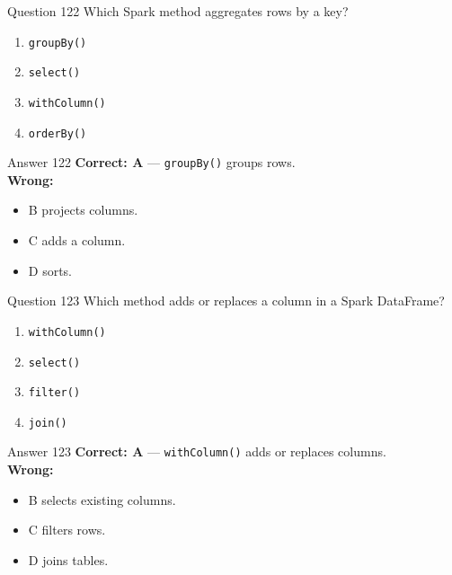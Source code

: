 \documentclass[aspectratio=169,11pt]{beamer}
\begin{document}
	\begin{frame}{Question 122}
		Which Spark method aggregates rows by a key?
		\begin{enumerate}[label=\Alph*.]
			\item \texttt{groupBy()}
			\item \texttt{select()}
			\item \texttt{withColumn()}
			\item \texttt{orderBy()}
		\end{enumerate}
	\end{frame}
	\begin{frame}{Answer 122}
		\textbf{Correct: A} --- \texttt{groupBy()} groups rows.\\
		\vspace{0.5em}
		\textbf{Wrong:}
		\begin{itemize}
			\item B projects columns.
			\item C adds a column.
			\item D sorts.
		\end{itemize}
	\end{frame}
	
	\begin{frame}{Question 123}
		Which method adds or replaces a column in a Spark DataFrame?
		\begin{enumerate}[label=\Alph*.]
			\item \texttt{withColumn()}
			\item \texttt{select()}
			\item \texttt{filter()}
			\item \texttt{join()}
		\end{enumerate}
	\end{frame}
	\begin{frame}{Answer 123}
		\textbf{Correct: A} --- \texttt{withColumn()} adds or replaces columns.\\
		\vspace{0.5em}
		\textbf{Wrong:}
		\begin{itemize}
			\item B selects existing columns.
			\item C filters rows.
			\item D joins tables.
		\end{itemize}
	\end{frame}
	
\end{document}
